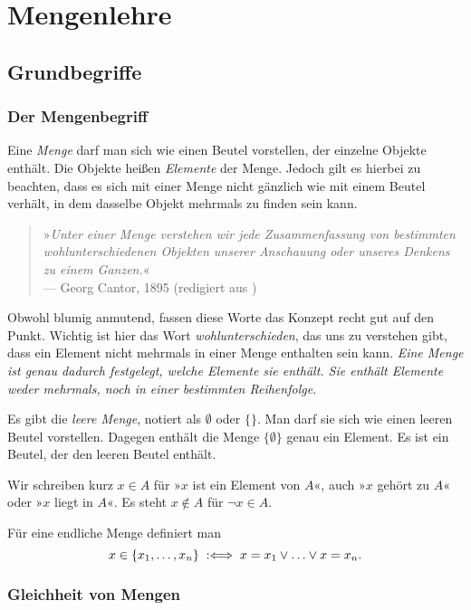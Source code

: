 
\chapter{Mengenlehre}

\section{Grundbegriffe}

\subsection{Der Mengenbegriff}

Eine \emph{Menge} darf man sich wie einen Beutel
vorstellen, der einzelne Objekte enthält. Die Objekte heißen
\emph{Elemente} der Menge. Jedoch gilt es hierbei zu
beachten, dass es sich mit einer Menge nicht gänzlich wie mit einem
Beutel verhält, in dem dasselbe Objekt mehrmals zu finden sein kann.
\begin{quote}
»\emph{Unter einer Menge verstehen wir jede Zusammenfassung von
bestimmten wohlunterschiedenen Objekten unserer Anschauung oder
unseres Denkens zu einem Ganzen.}«\\
--- Georg Cantor, 1895 (redigiert aus \cite{Cantor})
\end{quote}
Obwohl blumig anmutend, fassen diese Worte das Konzept recht gut
auf den Punkt. Wichtig ist hier das Wort \emph{wohlunterschieden},
das uns zu verstehen gibt, dass ein Element nicht mehrmals in einer
Menge enthalten sein kann. \emph{Eine Menge ist genau dadurch festgelegt,
welche Elemente sie enthält. Sie enthält Elemente weder mehrmals, noch
in einer bestimmten Reihenfolge.}

Es gibt die \emph{leere Menge}, notiert als
$\emptyset$ oder $\{\}$. Man darf sie sich wie einen leeren Beutel
vorstellen. Dagegen enthält die Menge $\{\emptyset\}$ genau ein Element.
Es ist ein Beutel,  der den leeren Beutel enthält.

Wir schreiben kurz $x\in A$ für »$x$ ist ein Element von $A$«,
auch »$x$ gehört zu $A$« oder »$x$ liegt in $A$«.
Es steht $x\notin A$ für $\lnot x\in A$.

Für eine endliche Menge definiert man
\[x\in\{x_1,\ldots,x_n\}\;:\Longleftrightarrow\; x=x_1\lor\ldots\lor x=x_n.\]

\subsection{Gleichheit von Mengen}

